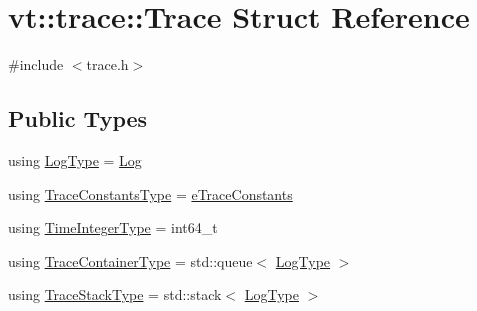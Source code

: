 \hypertarget{structvt_1_1trace_1_1_trace}{}\section{vt\+:\+:trace\+:\+:Trace Struct Reference}
\label{structvt_1_1trace_1_1_trace}


{\ttfamily \#include $<$trace.\+h$>$}

\subsection*{Public Types}
\begin{DoxyCompactItemize}
\item 
using \hyperlink{structvt_1_1trace_1_1_trace_a43306d96a91e49db081eaea016f1dd0a}{Log\+Type} = \hyperlink{structvt_1_1trace_1_1_log}{Log}
\item 
using \hyperlink{structvt_1_1trace_1_1_trace_accb35b20499dfdd46e6c79daae9fc265}{Trace\+Constants\+Type} = \hyperlink{namespacevt_1_1trace_acf454dfbd581b0ebae895f90b5927a1d}{e\+Trace\+Constants}
\item 
using \hyperlink{structvt_1_1trace_1_1_trace_ab8db9218a8ab87f59773fcbf81433787}{Time\+Integer\+Type} = int64\+\_\+t
\item 
using \hyperlink{structvt_1_1trace_1_1_trace_a9d07ee9d9e92f63674da9954cfe9830b}{Trace\+Container\+Type} = std\+::queue$<$ \hyperlink{structvt_1_1trace_1_1_trace_a43306d96a91e49db081eaea016f1dd0a}{Log\+Type} $>$
\item 
using \hyperlink{structvt_1_1trace_1_1_trace_ade12ee481e9ac72e94fe614ed03aa0dc}{Trace\+Stack\+Type} = std\+::stack$<$ \hyperlink{structvt_1_1trace_1_1_trace_a43306d96a91e49db081eaea016f1dd0a}{Log\+Type} $>$
\end{DoxyCompactItemize}
